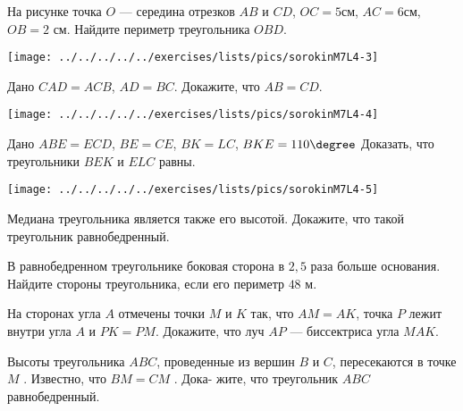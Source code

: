 \begin{class}[number=4]
\begin{listofex}
		\begin{minipage}[t]{\bodywidth}
			На рисунке точка \( O \) --- середина отрезков \( AB \) и \( CD \), \( OC= 5 \)см, \( AC=6 \)см, \( OB =  2 \) см. Найдите периметр треугольника \( OBD \).
		\end{minipage}
		\hspace{0.02\linewidth}
		\begin{minipage}[t]{\picwidth}
			\texttt{[image: ../../../../../exercises/lists/pics/sorokinM7L4-3]}
		\end{minipage}
		\item \begin{minipage}[t]{\bodywidth}
			Дано \( CAD =  ACB \), \( AD = BC \). Докажите, что \( AB = CD \).
		\end{minipage}
		\hspace{0.02\linewidth}
		\begin{minipage}[t]{\picwidth}
			\texttt{[image: ../../../../../exercises/lists/pics/sorokinM7L4-4]}
		\end{minipage}
		\item \begin{minipage}[t]{\bodywidth}
			Дано \(  ABE =  ECD \), \( BE = CE \), \( BK = LC \),  \( BKE= 110\degree \)  Доказать, что треугольники \( BEK \) и \( ELC  \) равны.
		\end{minipage}
		\hspace{0.02\linewidth}
		\begin{minipage}[t]{\picwidth}
			\texttt{[image: ../../../../../exercises/lists/pics/sorokinM7L4-5]}
		\end{minipage}
		\item Медиана треугольника является также его высотой. Докажите, что такой треугольник равнобедренный.
		\item В равнобедренном треугольнике боковая сторона в \( 2,5 \) раза больше основания. Найдите стороны треугольника, если его периметр \( 48  \) м.
		\item На сторонах угла \( A \) отмечены точки \( M \) и \( K \) так, что \( AM = AK \), точка \( P \) лежит внутри угла \( A \) и \( PK = PM \). Докажите, что луч \( AP \) --- биссектриса угла \( MAK \).
		\item Высоты треугольника \( ABC \), проведенные из вершин \( B \)
		и \( C \), пересекаются в точке \( M \) . Известно, что \( BM = CM \) . Дока-
		жите, что треугольник \( ABC \) равнобедренный.
		
		
	\end{listofex}
\end{class}

